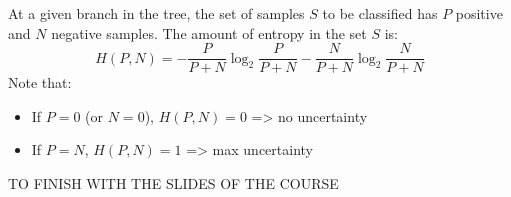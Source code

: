 At a given branch in the tree, the set of samples $S$ to be classified has $P$ positive and $N$ negative samples. The amount of entropy in the set $S$ is:
\[
 H(P,N)=-\frac{P}{P+N}\log_2\frac{P}{P+N}-\frac{N}{P+N}\log_2\frac{N}{P+N}
\]
Note that:
\begin{itemize}
 \item If $P=0$ (or $N=0$), $H(P,N)=0$ => no uncertainty
 \item If $P=N$, $H(P,N)=1$ => max uncertainty
\end{itemize}











{\huge \color{red} TO FINISH WITH THE SLIDES OF THE COURSE}
